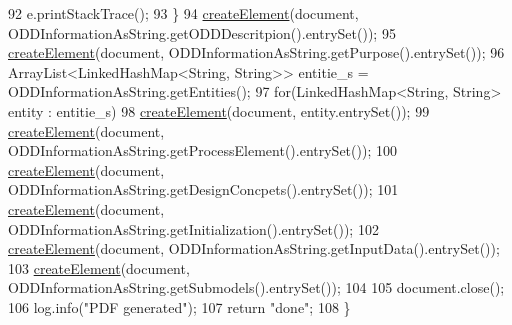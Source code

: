 \begin{DoxyCode}
92             e.printStackTrace();
93         \}
94         \hyperlink{classit_1_1isislab_1_1masonhelperdocumentation_1_1mason_1_1control_1_1_p_d_f_generator_ac98a9ab63c62a942fc1d410aab226e36}{createElement}(document, ODDInformationAsString.getODDDescritpion().entrySet());
95         \hyperlink{classit_1_1isislab_1_1masonhelperdocumentation_1_1mason_1_1control_1_1_p_d_f_generator_ac98a9ab63c62a942fc1d410aab226e36}{createElement}(document, ODDInformationAsString.getPurpose().entrySet());
96         ArrayList<LinkedHashMap<String, String>> entitie\_s = ODDInformationAsString.getEntities();
97         \textcolor{keywordflow}{for}(LinkedHashMap<String, String> entity : entitie\_s)
98             \hyperlink{classit_1_1isislab_1_1masonhelperdocumentation_1_1mason_1_1control_1_1_p_d_f_generator_ac98a9ab63c62a942fc1d410aab226e36}{createElement}(document, entity.entrySet());
99         \hyperlink{classit_1_1isislab_1_1masonhelperdocumentation_1_1mason_1_1control_1_1_p_d_f_generator_ac98a9ab63c62a942fc1d410aab226e36}{createElement}(document, ODDInformationAsString.getProcessElement().entrySet());
100         \hyperlink{classit_1_1isislab_1_1masonhelperdocumentation_1_1mason_1_1control_1_1_p_d_f_generator_ac98a9ab63c62a942fc1d410aab226e36}{createElement}(document, ODDInformationAsString.getDesignConcpets().entrySet());
101         \hyperlink{classit_1_1isislab_1_1masonhelperdocumentation_1_1mason_1_1control_1_1_p_d_f_generator_ac98a9ab63c62a942fc1d410aab226e36}{createElement}(document, ODDInformationAsString.getInitialization().entrySet());
102         \hyperlink{classit_1_1isislab_1_1masonhelperdocumentation_1_1mason_1_1control_1_1_p_d_f_generator_ac98a9ab63c62a942fc1d410aab226e36}{createElement}(document, ODDInformationAsString.getInputData().entrySet());
103         \hyperlink{classit_1_1isislab_1_1masonhelperdocumentation_1_1mason_1_1control_1_1_p_d_f_generator_ac98a9ab63c62a942fc1d410aab226e36}{createElement}(document, ODDInformationAsString.getSubmodels().entrySet()); 
104         
105         document.close();
106         log.info(\textcolor{stringliteral}{"PDF generated"});
107         \textcolor{keywordflow}{return} \textcolor{stringliteral}{"done"};
108     \}
\end{DoxyCode}


